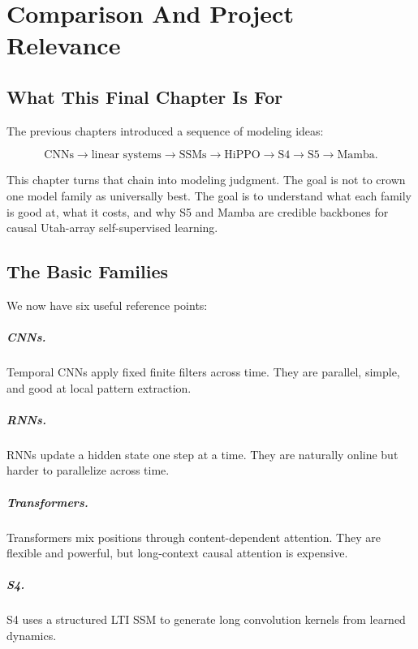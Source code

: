 \chapter{Comparison And Project Relevance}
\label{ch:comparison-and-project-relevance}

\section{What This Final Chapter Is For}

The previous chapters introduced a sequence of modeling ideas:

\[
  \text{CNNs}
  \rightarrow
  \text{linear systems}
  \rightarrow
  \text{SSMs}
  \rightarrow
  \text{HiPPO}
  \rightarrow
  \text{S4}
  \rightarrow
  \text{S5}
  \rightarrow
  \text{Mamba}.
\]

This chapter turns that chain into modeling judgment. The goal is not to crown one model
family as universally best. The goal is to understand what each family is good at, what it
costs, and why S5 and Mamba are credible backbones for causal Utah-array self-supervised
learning.

\section{The Basic Families}

We now have six useful reference points:

\paragraph{CNNs.}
Temporal CNNs apply fixed finite filters across time. They are parallel, simple, and good
at local pattern extraction.

\paragraph{RNNs.}
RNNs update a hidden state one step at a time. They are naturally online but harder to
parallelize across time.

\paragraph{Transformers.}
Transformers mix positions through content-dependent attention. They are flexible and
powerful, but long-context causal attention is expensive.

\paragraph{S4.}
S4 uses a structured LTI SSM to generate long convolution kernels from learned dynamics.

